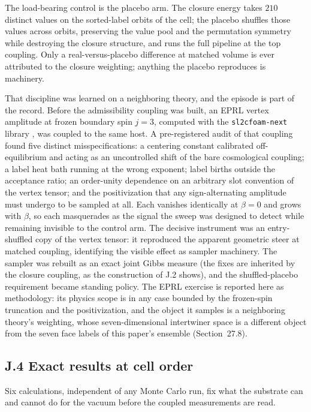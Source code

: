\documentclass[11pt]{article}
\begin{document}
The load-bearing control is the placebo arm. The closure energy takes $210$ distinct values on the sorted-label orbits of the cell; the placebo shuffles those values across orbits, preserving the value pool and the permutation symmetry while destroying the closure structure, and runs the full pipeline at the top coupling. Only a real-versus-placebo difference at matched volume is ever attributed to the closure weighting; anything the placebo reproduces is machinery.

That discipline was learned on a neighboring theory, and the episode is part of the record. Before the admissibility coupling was built, an EPRL vertex amplitude \citep{EPRL2008} at frozen boundary spin $j=3$, computed with the \texttt{sl2cfoam-next} library \citep{Gozzini2021}, was coupled to the same host. A pre-registered audit of that coupling found five distinct misspecifications: a centering constant calibrated off-equilibrium and acting as an uncontrolled shift of the bare cosmological coupling; a label heat bath running at the wrong exponent; label births outside the acceptance ratio; an order-unity dependence on an arbitrary slot convention of the vertex tensor; and the positivization that any sign-alternating amplitude must undergo to be sampled at all. Each vanishes identically at $\beta=0$ and grows with $\beta$, so each masquerades as the signal the sweep was designed to detect while remaining invisible to the control arm. The decisive instrument was an entry-shuffled copy of the vertex tensor: it reproduced the apparent geometric steer at matched coupling, identifying the visible effect as sampler machinery. The sampler was rebuilt as an exact joint Gibbs measure (the fixes are inherited by the closure coupling, as the construction of J.2 shows), and the shuffled-placebo requirement became standing policy. The EPRL exercise is reported here as methodology: its physics scope is in any case bounded by the frozen-spin truncation and the positivization, and the object it samples is a neighboring theory's weighting, whose seven-dimensional intertwiner space is a different object from the seven face labels of this paper's ensemble (Section~27.8).

\subsection*{J.4 Exact results at cell order}

Six calculations, independent of any Monte Carlo run, fix what the substrate can and cannot do for the vacuum before the coupled measurements are read.
\end{document}
